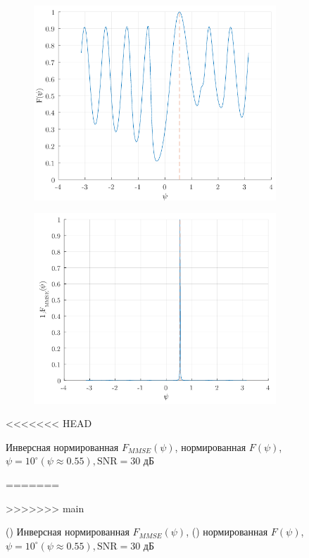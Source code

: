 \begin{figure}[htbp]
    \begin{subfigure}{0.49\linewidth}
        \centering
        \includegraphics[width=\linewidth]{figs/fig4.10a}
        \caption{}
        \label{fig:4.10a}
    \end{subfigure}
    \begin{subfigure}{0.49\linewidth}
        \centering
        \includegraphics[width=\linewidth]{figs/fig4.10b}
        \caption{}
        \label{fig:4.10b}
    \end{subfigure}
<<<<<<< HEAD
    \caption{  Инверсная нормированная $F_{MMSE}(\psi)$,  нормированная $F(\psi)$, $\psi=10^\circ(\psi \approx 0.55), \text{SNR}=30$ дБ}
=======
    \caption{ () Инверсная нормированная $F_{MMSE}(\psi)$,
    () нормированная $F(\psi)$, $\psi=10^\circ(\psi \approx
    0.55), \text{SNR}=30$ дБ}
    \label{fig:4.100}
>>>>>>> main
\end{figure}

